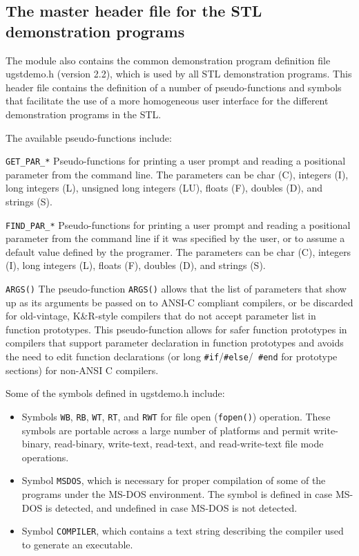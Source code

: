 \subsection {The master header file for the STL demonstration programs}

The module also contains the common demonstration program definition file
ugstdemo.h (version 2.2), which is used by all STL demonstration programs. This
header file contains the definition of a number of pseudo-functions
and symbols that facilitate the use of a more homogeneous user
interface for the different demonstration programs in the STL.

The available pseudo-functions include:
\begin{Descr}{30mm}
 \item[{\tt GET\_PAR\_*}]
        Pseudo-functions for printing a user prompt and reading a
        positional parameter from the command line. The parameters can
        be char (C), integers (I), long integers (L), unsigned long
        integers (LU), floats (F), doubles (D), and strings (S).

\item[{\tt FIND\_PAR\_*}]
        Pseudo-functions for printing a user prompt and reading a
        positional parameter from the command line if it was specified
        by the user, or to assume a default value defined by the
        programer. The parameters can be char (C), integers (I), long
        integers (L), floats (F), doubles (D), and strings (S).

 \item[{\tt ARGS()}]
        The pseudo-function {\tt ARGS()} allows that the list of
        parameters that show up as its arguments be passed on to
        ANSI-C compliant compilers, or be discarded for
        old-vintage, K\&R-style compilers that do not accept parameter
        list in function prototypes. This pseudo-function allows for
        safer function prototypes in compilers that support parameter
        declaration in function prototypes and avoids the need to edit
        function declarations (or long {\tt \#if}/{\tt \#else}/{\tt
        \#end} for prototype sections) for non-ANSI C compilers.
\end{Descr}

Some of the symbols defined in ugstdemo.h include:
\begin{itemize}
 \item  Symbols {\tt WB}, {\tt RB}, {\tt WT}, {\tt RT}, and {\tt RWT}
        for file open ({\tt fopen()}) operation. These symbols are
        portable across a large number of platforms and permit
        write-binary, read-binary, write-text, read-text, and
        read-write-text file mode operations.
 \item  Symbol {\tt MSDOS}, which is necessary for proper compilation
        of some of the programs under the MS-DOS environment. The
        symbol is defined in case MS-DOS is detected, and undefined in
        case MS-DOS is not detected.
 \item  Symbol {\tt COMPILER}, which contains a text string describing
        the compiler used to generate an executable.
\end{itemize}



